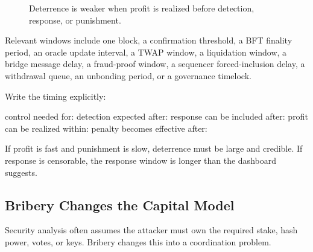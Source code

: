 \begin{figure}[htbp]
\centering
{}
\caption{Deterrence is weaker when profit is realized before detection, response, or punishment.}
\end{figure}

Relevant windows include one block, a confirmation threshold, a BFT finality period, an oracle update interval, a TWAP window, a liquidation window, a bridge message delay, a fraud-proof window, a sequencer forced-inclusion delay, a withdrawal queue, an unbonding period, or a governance timelock.

Write the timing explicitly:

\begin{codeblock}
control needed for:
detection expected after:
response can be included after:
profit can be realized within:
penalty becomes effective after:
\end{codeblock}

If profit is fast and punishment is slow, deterrence must be large and credible. If response is censorable, the response window is longer than the dashboard suggests.

\subsection{Bribery Changes the Capital Model}

Security analysis often assumes the attacker must own the required stake, hash power, votes, or keys. Bribery changes this into a coordination problem.

